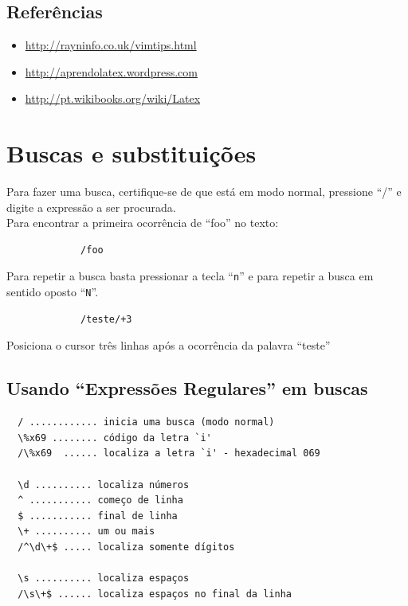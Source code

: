 \documentclass[10pt,a4paper,openany]{book}
\begin{document}
\section{Referências}
\label{Referências}

\begin{itemize}
	\item \url{http://rayninfo.co.uk/vimtips.html}
	\item \url{http://aprendolatex.wordpress.com}
	\item \url{http://pt.wikibooks.org/wiki/Latex}
\end{itemize}

\chapter{Buscas e substituições}\label{Buscas e substituições}

Para fazer uma busca, certifique-se de que está em modo normal,
pressione ``/'' e digite a expressão a ser procurada. \\


Para encontrar a primeira ocorrência de ``foo'' no texto:

\begin{verbatim}
			 /foo
\end{verbatim}

Para repetir a busca basta pressionar a tecla ``\verb+n+'' e para
repetir a busca em sentido oposto ``\verb+N+''.

\begin{verbatim}
			 /teste/+3
\end{verbatim}

Posiciona o cursor três linhas após a ocorrência da palavra ``teste'' \\


\section{Usando ``Expressões Regulares'' em buscas}

\begin{verbatim}
  / ............ inicia uma busca (modo normal)
  \%x69 ........ código da letra `i'
  /\%x69  ...... localiza a letra `i' - hexadecimal 069

  \d .......... localiza números
  ^ ........... começo de linha
  $ ........... final de linha
  \+ .......... um ou mais
  /^\d\+$ ..... localiza somente dígitos

  \s .......... localiza espaços
  /\s\+$ ...... localiza espaços no final da linha 
\end{verbatim}
\end{document}
